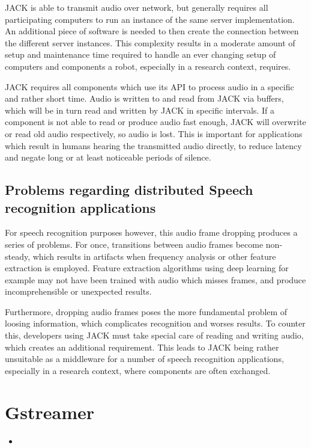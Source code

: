 JACK is able to transmit audio over network, but generally requires all participating computers to run an instance of the same server implementation. 
An additional piece of software is needed to then create the connection between the different server instances. 
This complexity results in a moderate amount of setup and maintenance time required to handle an ever changing setup of computers and components a robot, especially in a research context, requires.

JACK requires all components which use its API to process audio in a specific and rather short time. 
Audio is written to and read from JACK via buffers, which will be in turn read and written by JACK in specific intervals.
If a component is not able to read or produce audio fast enough, JACK will overwrite or read old audio respectively, so audio is lost. 
This is important for applications which result in humans hearing the transmitted audio directly, to reduce latency and negate long or at least noticeable periods of silence.

\subsection{Problems regarding distributed Speech recognition applications}
For speech recognition purposes however, this audio frame dropping produces a series of problems. 
For once, transitions between audio frames become non-steady, which results in artifacts when frequency analysis or other feature extraction is employed.
Feature extraction algorithms using deep learning for example may not have been trained with audio which misses frames, and produce incomprehensible or unexpected results.

Furthermore, dropping audio frames poses the more fundamental problem of loosing information, which complicates recognition and worses results. 
To counter this, developers using JACK must take special care of reading and writing audio, which creates an additional requirement.
This leads to JACK being rather unsuitable as a middleware for a number of speech recognition applications, especially in a research context, where components are often exchanged.


\section{Gstreamer}

\begin{itemize}
	\item 
\end{itemize}

